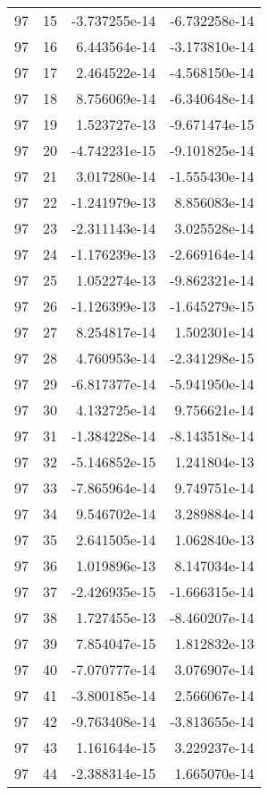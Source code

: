 \begin{tabular}{rrrr}
  97 &   15 & -3.737255e-14 & -6.732258e-14 \\
  97 &   16 &  6.443564e-14 & -3.173810e-14 \\
  97 &   17 &  2.464522e-14 & -4.568150e-14 \\
  97 &   18 &  8.756069e-14 & -6.340648e-14 \\
  97 &   19 &  1.523727e-13 & -9.671474e-15 \\
  97 &   20 & -4.742231e-15 & -9.101825e-14 \\
  97 &   21 &  3.017280e-14 & -1.555430e-14 \\
  97 &   22 & -1.241979e-13 &  8.856083e-14 \\
  97 &   23 & -2.311143e-14 &  3.025528e-14 \\
  97 &   24 & -1.176239e-13 & -2.669164e-14 \\
  97 &   25 &  1.052274e-13 & -9.862321e-14 \\
  97 &   26 & -1.126399e-13 & -1.645279e-15 \\
  97 &   27 &  8.254817e-14 &  1.502301e-14 \\
  97 &   28 &  4.760953e-14 & -2.341298e-15 \\
  97 &   29 & -6.817377e-14 & -5.941950e-14 \\
  97 &   30 &  4.132725e-14 &  9.756621e-14 \\
  97 &   31 & -1.384228e-14 & -8.143518e-14 \\
  97 &   32 & -5.146852e-15 &  1.241804e-13 \\
  97 &   33 & -7.865964e-14 &  9.749751e-14 \\
  97 &   34 &  9.546702e-14 &  3.289884e-14 \\
  97 &   35 &  2.641505e-14 &  1.062840e-13 \\
  97 &   36 &  1.019896e-13 &  8.147034e-14 \\
  97 &   37 & -2.426935e-15 & -1.666315e-14 \\
  97 &   38 &  1.727455e-13 & -8.460207e-14 \\
  97 &   39 &  7.854047e-15 &  1.812832e-13 \\
  97 &   40 & -7.070777e-14 &  3.076907e-14 \\
  97 &   41 & -3.800185e-14 &  2.566067e-14 \\
  97 &   42 & -9.763408e-14 & -3.813655e-14 \\
  97 &   43 &  1.161644e-15 &  3.229237e-14 \\
  97 &   44 & -2.388314e-15 &  1.665070e-14 \\

\end{tabular}
